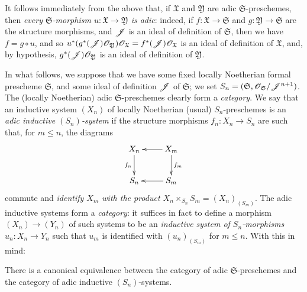 It follows immediately from the above that, if $\mathfrak{X}$ and $\mathfrak{Y}$ are adic $\mathfrak{S}$-preschemes, then \emph{every $\mathfrak{S}$-morphism $u:\mathfrak{X}\to\mathfrak{Y}$ is adic}:
indeed, if $f:\mathfrak{X}\to\mathfrak{S}$ and $g:\mathfrak{Y}\to\mathfrak{S}$ are the structure morphisms, and $\mathscr{J}$ is an ideal of definition of $\mathfrak{S}$, then we have $f=g\circ u$, and so $u^*(g^*(\mathscr{J})\mathscr{O}_\mathfrak{Y})\mathscr{O}_\mathfrak{X}=f^*(\mathscr{J})\mathscr{O}_\mathfrak{X}$ is an ideal of definition of $\mathfrak{X}$, and, by hypothesis, $g^*(\mathscr{J})\mathscr{O}_\mathfrak{Y}$ is an ideal of definition of $\mathfrak{Y}$.

\begin{env}[10.12.2]
\label{1.10.12.2}
In what follows, we suppose that we have some fixed locally Noetherian formal prescheme $\mathfrak{S}$, and some ideal of definition $\mathscr{J}$ of $\mathfrak{S}$;
we set $S_n=(\mathfrak{S},\mathscr{O}_\mathfrak{S}/\mathscr{J}^{n+1})$.
The (locally Noetherian) adic $\mathfrak{S}$-preschemes clearly form a \emph{category}.
We say that an inductive system $(X_n)$ of locally Noetherian (usual) $S_n$-preschemes is an \emph{adic inductive $(S_n)$-system} if the structure morphisms $f_n:X_n\to S_n$ are such that, for $m\leq n$, the diagrams
\[
  \xymatrix{
    X_n \ar[d]_{f_n}
    & X_m \ar[l] \ar[d]^{f_m}\\
    S_n
    & S_m \ar[l]
  }
\]
commute and \emph{identify $X_m$ with the product $X_n\times_{S_n}S_m=(X_n)_{(S_m)}$}.
The adic inductive systems form a \emph{category}:
it suffices in fact to define a morphism $(X_n)\to(Y_n)$ of such systems to be an \emph{inductive system of $S_n$-morphisms $u_n:X_n\to Y_n$} such that $u_m$ is identified with $(u_n)_{(S_m)}$ for $m\leq n$.
With this in mind:
\end{env}

\begin{theorem}[10.12.3]
\label{1.10.12.3}
There is a canonical equivalence between the category of adic $\mathfrak{S}$-preschemes and the category of adic inductive $(S_n)$-systems.
\end{theorem}

